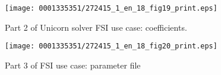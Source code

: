\begin{figure}[!p]
\bwfig
\texttt{[image: 0001335351/272415\_1\_en\_18\_fig19\_print.eps]}
\caption{Part 2 of Unicorn solver FSI use case: coefficients.}
\label{code:UseCasePart2}
\end{figure}

\begin{figure}[!p]
\vspace*{-11pt}
\bwfig
\texttt{[image: 0001335351/272415\_1\_en\_18\_fig20\_print.eps]}
\caption{Part 3 of FSI use case: parameter file}
\label{code:UseCasePart3}
\end{figure}

